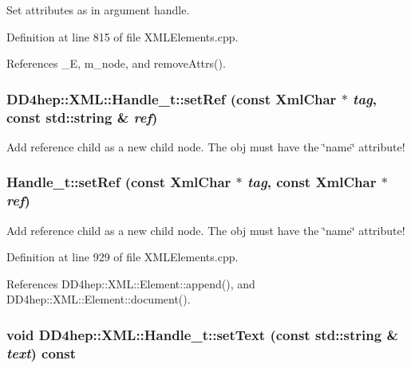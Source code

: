Set attributes as in argument handle. 

Definition at line 815 of file XMLElements.cpp.

References \_\-E, m\_\-node, and removeAttrs().\hypertarget{class_d_d4hep_1_1_x_m_l_1_1_handle__t_aca8789134902fbaf62ce44fc5e51400d}{
\subsubsection[{setRef}]{ DD4hep::XML::Handle\_\-t::setRef (const {\bf XmlChar} $\ast$ {\em tag}, \/  const std::string \& {\em ref})}}
\label{class_d_d4hep_1_1_x_m_l_1_1_handle__t_aca8789134902fbaf62ce44fc5e51400d}


Add reference child as a new child node. The obj must have the \char`\"{}name\char`\"{} attribute! \hypertarget{class_d_d4hep_1_1_x_m_l_1_1_handle__t_a2906b635e870e0f88f60ca39c575bceb}{
\subsubsection[{setRef}]{ Handle\_\-t::setRef (const {\bf XmlChar} $\ast$ {\em tag}, \/  const {\bf XmlChar} $\ast$ {\em ref})}}
\label{class_d_d4hep_1_1_x_m_l_1_1_handle__t_a2906b635e870e0f88f60ca39c575bceb}


Add reference child as a new child node. The obj must have the \char`\"{}name\char`\"{} attribute! 

Definition at line 929 of file XMLElements.cpp.

References DD4hep::XML::Element::append(), and DD4hep::XML::Element::document().\hypertarget{class_d_d4hep_1_1_x_m_l_1_1_handle__t_ad797ed301255dd7547f804ae2344f39d}{
\subsubsection[{setText}]{\setlength{\rightskip}{0pt plus 5cm}void DD4hep::XML::Handle\_\-t::setText (const std::string \& {\em text}) const}}
\label{class_d_d4hep_1_1_x_m_l_1_1_handle__t_ad797ed301255dd7547f804ae2344f39d}


